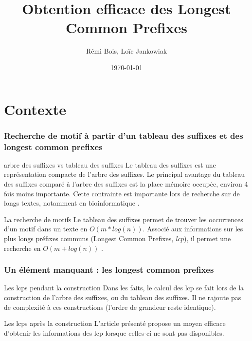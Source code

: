 \documentclass[10pt]{beamer}
\title{Obtention efficace des Longest Common Prefixes}
\author{Rémi Bois, Loïc Jankowiak}
\date{\today}
\begin{document}
\begin{frame}
  \maketitle

\end{frame}

\begin{frame}
  \tableofcontents
\end{frame}

\section{Contexte}
\label{sec:context}


\begin{frame}
  \frametitle{Recherche de motif à partir d'un tableau des suffixes
    et des longest common prefixes}

  \begin{block}{arbre des suffixes vs tableau des suffixes} 
    Le tableau des suffixes est une représentation compacte de l'arbre
    des suffixes. Le principal avantage du tableau des suffixes comparé à
    l'arbre des suffixes est la place mémoire occupée, environ 4 fois
    moins importante. Cette contrainte est importante lors de
    recherche sur de longs textes, notamment en bioinformatique \cite{Raffinot11}.
  \end{block}

  \pause

  \begin{block}{La recherche de motifs}
    Le tableau des suffixes permet de trouver les occurrences d'un
    motif dans un texte en $O(m*log(n))$. Associé aux informations sur
    les plus longs préfixes communs (Longest Common Prefixes,
    \emph{lcp}), il permet une recherche en $O(m + log(n))$ \cite{Manber93}.
  \end{block}
  
\end{frame}

\begin{frame}
  \frametitle{Un élément manquant : les longest common prefixes}

  \begin{block}{Les lcps pendant la construction}
      Dans les faits, le calcul des lcp se fait lors de la construction de
      l'arbre des suffixes, ou du tableau des suffixes. Il ne rajoute pas
      de complexité à ces constructions (l'ordre de grandeur reste
      identique).
  \end{block}
  \pause
  \begin{block}{Les lcps après la construction}
    L'article présenté propose un moyen efficace d'obtenir
    les informations des lcp lorsque celles-ci ne sont pas
    disponibles\cite{Kasai01}.
  \end{block}

\end{frame}
\end{document}
